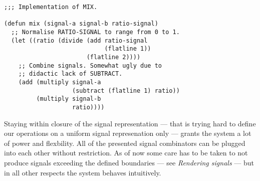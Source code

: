 \begin{verbatim}
;;; Implementation of MIX.

(defun mix (signal-a signal-b ratio-signal)
  ;; Normalise RATIO-SIGNAL to range from 0 to 1.
  (let ((ratio (divide (add ratio-signal
                            (flatline 1))
                       (flatline 2))))
    ;; Combine signals. Somewhat ugly due to
    ;; didactic lack of SUBTRACT.
    (add (multiply signal-a
                   (subtract (flatline 1) ratio))
         (multiply signal-b
                   ratio))))
\end{verbatim}

Staying within closure of the signal representation --- that is trying
hard to define our operations on a uniform signal represenation only ---
grants the system a lot of power and flexbility. All of the presented
signal combinators can be plugged into each other without restriction. As
of now some care has to be taken to not produce signals exceeding the
defined boundaries --- see \textit{Rendering signals} --- but in all
other respects the system behaves intuitively.

